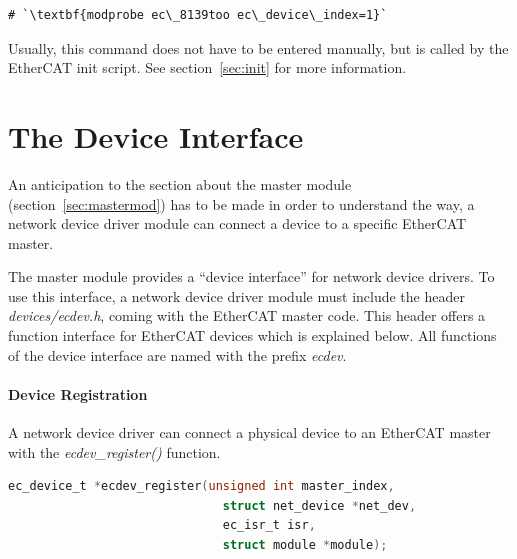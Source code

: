 \documentclass[a4paper,12pt,BCOR6mm,bibtotoc,idxtotoc]{scrbook}
\begin{document}
\begin{lstlisting}[gobble=2]
  # `\textbf{modprobe ec\_8139too ec\_device\_index=1}`
\end{lstlisting}

Usually, this command does not have to be entered manually, but is
called by the EtherCAT init script. See section~\ref{sec:init} for
more information.


\section{The Device Interface}
\label{sec:ecdev}

An anticipation to the section about the master module
(section~\ref{sec:mastermod}) has to be made in order to understand
the way, a network device driver module can connect a device to a
specific EtherCAT master.

The master module provides a ``device interface'' for network device
drivers. To use this interface, a network device driver module must
include the header
\textit{devices/ecdev.h}, coming
with the EtherCAT master code. This header offers a function interface
for EtherCAT devices which is explained below. All functions of the
device interface are named with the prefix \textit{ecdev}.

\paragraph{Device Registration}

A network device driver can connect a physical device to an EtherCAT
master with the \textit{ecdev\_register()} function.

\begin{lstlisting}[gobble=2,language=C]
  ec_device_t *ecdev_register(unsigned int master_index,
                              struct net_device *net_dev,
                              ec_isr_t isr,
                              struct module *module);
\end{lstlisting}
\end{document}
